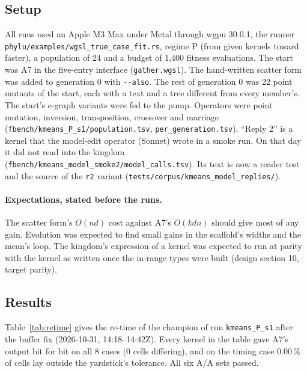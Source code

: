 \documentclass[sigconf,nonacm]{acmart}
\newcommand{\code}[1]{\nolinkurl{#1}}
\newcommand{\src}[1]{{\footnotesize\nolinkurl{#1}}}
\begin{document}
\subsection{Setup}
\label{sec:setup}
All runs used an Apple M3 Max under Metal through wgpu 30.0.1, the runner
\src{phylu/examples/wgsl_true_case_fit.rs}, regime P (from given kernels toward
faster), a population of 24 and a budget of 1,400 fitness evaluations. The
start was A7 in the five-entry interface (\src{gather.wgsl}). The hand-written
scatter form was added to generation 0 with \code{--also}. The rest of
generation 0 was 22 point mutants of the start, each with a text and a tree
different from every member's. The start's e-graph variants were fed to the
pump. Operators were point mutation, inversion, transposition, crossover and
marriage (\src{fbench/kmeans_P_s1/population.tsv},
\src{per_generation.tsv}). ``Reply 2'' is a kernel that the model-edit operator
(Sonnet) wrote in a smoke run. On that day it did not read into the kingdom
(\src{fbench/kmeans_model_smoke2/model_calls.tsv}). Its text is now a reader
test and the source of the \code{r2} variant
(\src{tests/corpus/kmeans_model_replies/}).

\paragraph{Expectations, stated before the runs.} The scatter form's
$O(nd)$ cost against A7's $O(kdn)$ should give most of any gain. Evolution was
expected to find small gains in the scaffold's widths and the mean's loop. The
kingdom's expression of a kernel was expected to run at parity with the kernel
as written once the in-range types were built (design section 10, target
parity).

\subsection{Results}
Table~\ref{tab:retime} gives the re-time of the champion of run
\code{kmeans_P_s1} after the buffer fix (2026-10-31, 14:18--14:42Z). Every
kernel in the table gave A7's output bit for bit on all 8 cases (0 cells
differing), and on the timing case 0.00\,\% of cells lay outside the
yardstick's tolerance. All six A/A sets passed.
\end{document}
